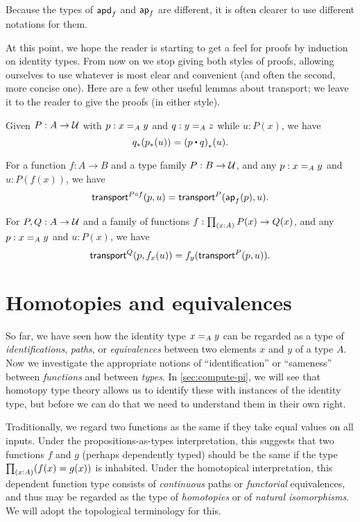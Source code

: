 Because the types of $\apdfunc{f}$ and $\apfunc{f}$ are different, it is often clearer to use different notations for them.

At this point, we hope the reader is starting to get a feel for proofs by induction on identity types.
From now on we stop giving both styles of proofs, allowing ourselves to use whatever is most clear and convenient (and often the second, more concise one).
Here are a few other useful lemmas about transport; we leave it to the reader to give the proofs (in either style).

\begin{lem}\label{thm:transport-concat}
  Given $P:A\to\type$ with $p:\id[A]xy$ and $q:\id[A]yz$ while $u:P(x)$, we have
  \[ \trans{q}{\trans{p}{u}} = \trans{(p\ct q)}{u}. \]
\end{lem}

\begin{lem}\label{thm:transport-compose}
  For a function $f:A\to B$ and a type family $P:B\to\type$, and any $p:\id[A]xy$ and $u:P(f(x))$, we have
  \[ \transfib{P\circ f}{p}{u} = \transfib{P}{\apfunc f(p)}{u}. \]
\end{lem}

\begin{lem}\label{thm:ap-transport}
  For $P,Q:A\to \type$ and a family of functions $f:\prd{x:A} P(x)\to Q(x)$, and any $p:\id[A]xy$ and $u:P(x)$, we have
  \[ \transfib{Q}{p}{f_x(u)} = f_y(\transfib{P}{p}{u}). \]
\end{lem}

\section{Homotopies and equivalences}
\label{sec:basics-equivalences}

So far, we have seen how the identity type $\id[A]xy$ can be regarded as a type of \emph{identifications}, \emph{paths}, or \emph{equivalences} between two elements $x$ and $y$ of a type $A$.
Now we investigate the appropriate notions of ``identification'' or ``sameness'' between \emph{functions} and between \emph{types}.
In \autoref{sec:compute-pi}, we will see that homotopy type theory allows us to identify these with instances of the identity type, but before we can do that we need to understand them in their own right.

Traditionally, we regard two functions as the same if they take equal values on all inputs.
Under the propositions-as-types interpretation, this suggests that two functions $f$ and $g$ (perhaps dependently typed) should be the same if the type $\prd{x:A} (f(x)=g(x))$ is inhabited.
Under the homotopical interpretation, this dependent function type consists of \emph{continuous} paths or \emph{functorial} equivalences, and thus may be regarded as the type of \emph{homotopies} or of \emph{natural isomorphisms}.
We will adopt the topological terminology for this.

